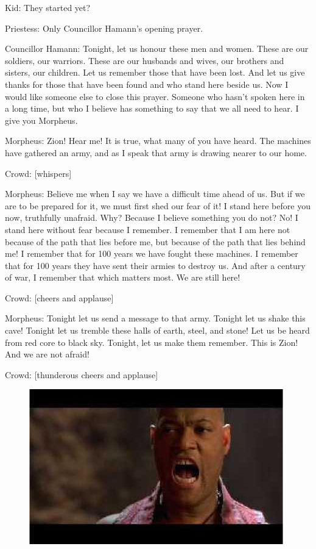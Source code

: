 \documentclass[UTF8]{ctexart}
\newenvironment{myquote}{\color{green} \setlength{\leftskip}{6em} \setlength{\rightskip}{4em} \setlength{\parindent}{-2em}}{\par}
\begin{document}
\begin{myquote}
Kid: They started yet?

Priestess: Only Councillor Hamann's opening prayer.

Councillor Hamann: Tonight, let us honour these men and women. These are our soldiers, our warriors. These are our husbands and wives, our brothers and sisters, our children. Let us remember those that have been lost. And let us give thanks for those that have been found and who stand here beside us. Now I would like someone else to close this prayer. Someone who hasn't spoken here in a long time, but who I believe has something to say that we all need to hear. I give you Morpheus.

Morpheus: Zion! Hear me! It is true, what many of you have heard. The machines have gathered an army, and as I speak that army is drawing nearer to our home.

Crowd: [whispers]

Morpheus: Believe me when I say we have a difficult time ahead of us. But if we are to be prepared for it, we must first shed our fear of it! I stand here before you now, truthfully unafraid. Why? Because I believe something you do not? No! I stand here without fear because I remember. I remember that I am here not because of the path that lies before me, but because of the path that lies behind me! I remember that for 100 years we have fought these machines. I remember that for 100 years they have sent their armies to destroy us. And after a century of war, I remember that which matters most. We are still here!

Crowd: [cheers and applause]

Morpheus: Tonight let us send a message to that army. Tonight let us shake this cave! Tonight let us tremble these halls of earth, steel, and stone! Let us be heard from red core to black sky. Tonight, let us make them remember. This is Zion! And we are not afraid!

Crowd: [thunderous cheers and applause]
\end{myquote}

\begin{figure}[htb]
\centering
\includegraphics[width=0.5\linewidth]{fig/read_reloaded-41}
\end{figure}
\end{document}
